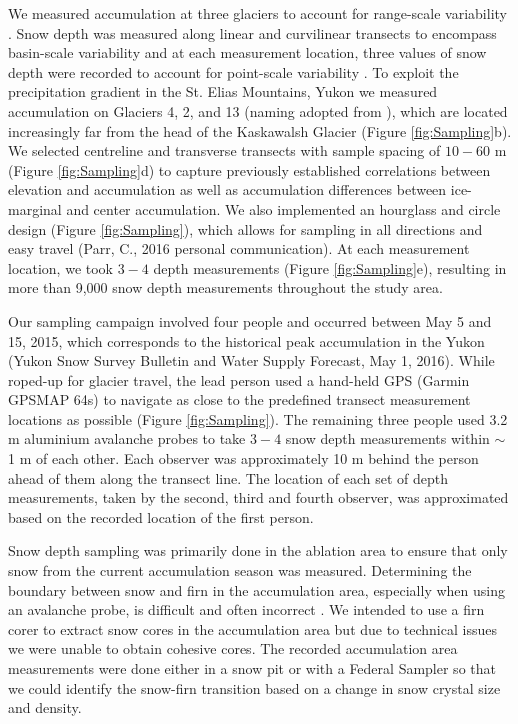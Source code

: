 \documentclass[twocolumn,letterpaper]{igs}
\begin{document}
We measured accumulation at three glaciers to account for range-scale variability \citep{Clark2011}. Snow depth was measured along linear and curvilinear transects to encompass basin-scale variability and at each measurement location, three values of snow depth were recorded to account for point-scale variability \citep{Clark2011}. To exploit the precipitation gradient in the St. Elias Mountains, Yukon \citep{Taylor1969} we measured accumulation on Glaciers 4, 2, and 13 (naming adopted from \cite{Crompton2016}), which are located increasingly far from the head of the Kaskawalsh Glacier (Figure \ref{fig:Sampling}b). We selected centreline and transverse transects with sample spacing of $10-60$ m (Figure \ref{fig:Sampling}d) to capture previously established correlations between elevation and accumulation \citep[e.g.][]{Machguth2006,Walmsley2015} as well as accumulation differences between ice-marginal and center accumulation. We also implemented an hourglass and circle design (Figure \ref{fig:Sampling}), which allows for sampling in all directions and easy travel (Parr, C., 2016 personal communication). At each measurement location, we took $3-4$ depth measurements (Figure \ref{fig:Sampling}e), resulting in more than 9,000 snow depth measurements throughout the study area. 

Our sampling campaign involved four people and occurred between May 5 and 15, 2015, which corresponds to the historical peak accumulation in the Yukon (Yukon Snow Survey Bulletin and Water Supply Forecast, May 1, 2016). While roped-up for glacier travel, the lead person used a hand-held GPS (Garmin GPSMAP 64s) to navigate as close to the predefined transect measurement locations as possible (Figure \ref{fig:Sampling}). The remaining three people used 3.2 m aluminium avalanche probes to take $3-4$ snow depth measurements within $\sim$1 m of each other. Each observer was approximately 10 m behind the person ahead of them along the transect line. The location of each set of depth measurements, taken by the second, third and fourth observer, was approximated based on the recorded location of the first person. 

Snow depth sampling was primarily done in the ablation area to ensure that only snow from the current accumulation season was measured. Determining the boundary between snow and firn in the accumulation area, especially when using an avalanche probe, is difficult and often incorrect \citep{Grunewald2010,Sold2013}. We intended to use a firn corer to extract snow cores in the accumulation area but due to technical issues we were unable to obtain cohesive cores. The recorded accumulation area measurements were done either in a snow pit or with a Federal Sampler so that we could identify the snow-firn transition based on a change in snow crystal size and density. 
\end{document}
